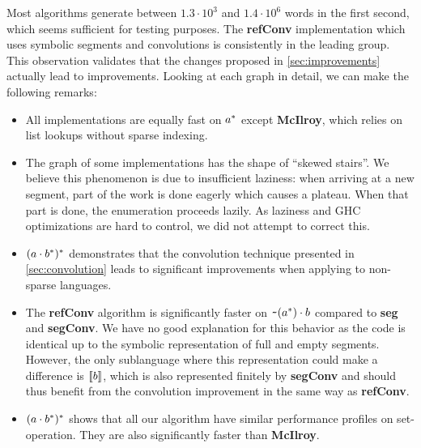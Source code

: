 Most algorithms generate between $1.3\cdot10^3$ and $1.4\cdot10^6$ words in the first
second, which seems sufficient for testing purposes.
The \textbf{refConv} implementation
which uses symbolic segments and convolutions is consistently in the
leading group.
This observation validates that the
changes proposed in \cref{sec:improvements} actually lead to
improvements.
%
Looking at each graph in detail, we can make the following
remarks:
\begin{itemize}[leftmargin=*]
\item All implementations are equally fast on $a^*$ except
  \textbf{McIlroy}, which relies on list lookups without
  sparse indexing.
\item The graph of some implementations
  has the shape of ``skewed stairs''. We believe this phenomenon is due to
  insufficient laziness: when arriving at a new segment, part of the
  work is done eagerly which causes a plateau. When that part is done,
  the enumeration proceeds lazily.  As laziness and GHC
  optimizations are hard to control, we did not attempt to correct this.
\item $(a \cdot{b^*})^*$ demonstrates that
  the convolution technique presented in \cref{sec:convolution}
  leads to significant improvements when applying  to non-sparse languages.
\item The \textbf{refConv} algorithm is
  significantly faster on $\texttt{\textasciitilde}{(a^*)} \cdot{b}$
  compared to \textbf{seg} and \textbf{segConv}. We have no good
  explanation for this behavior as the code is identical up to the
  symbolic representation of full and empty segments. However, the
  only sublanguage where this representation could make a difference
  is $\llbracket b\rrbracket$, which is also represented finitely by
  \textbf{segConv} and should thus benefit from the convolution
  improvement in the same way as \textbf{refConv}.
\item $(a \cdot{b^*})^*$ shows that all our algorithm have similar
  performance profiles on set-operation. They are also significantly
  faster than \textbf{McIlroy}.
\end{itemize}


